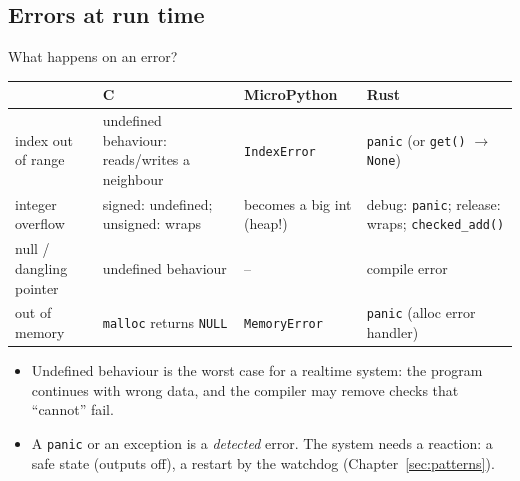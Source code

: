 \subsection{Errors at run time}
\begin{frame}{What happens on an error?}
  \begin{center}\footnotesize
  \begin{tabular}{@{}p{}p{}p{}p{}@{}}
    \toprule
    & C & MicroPython & Rust \\
    \midrule
    index out of range & undefined behaviour: reads/writes a neighbour & \texttt{IndexError} & \texttt{panic} (or \texttt{get()} $\rightarrow$ \texttt{None}) \\
    integer overflow & signed: undefined; unsigned: wraps & becomes a big int (heap!) & debug: \texttt{panic}; release: wraps; \texttt{checked\_add()} \\
    null / dangling pointer & undefined behaviour & -- & compile error \\
    out of memory & \texttt{malloc} returns \texttt{NULL} & \texttt{MemoryError} & \texttt{panic} (alloc error handler) \\
    \bottomrule
  \end{tabular}
  \end{center}
  \begin{itemize}
    \item Undefined behaviour is the worst case for a realtime system: the program continues with wrong data, and the compiler may remove checks that ``cannot'' fail.
    \item A \texttt{panic} or an exception is a \emph{detected} error. The system needs a reaction: a safe state (outputs off), a restart by the watchdog (Chapter~\ref{sec:patterns}).
  \end{itemize}
\end{frame}

